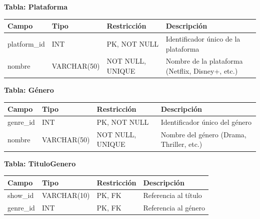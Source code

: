 \documentclass[12pt,a4paper]{article}
\begin{document}
\vspace{0.5cm}

\textbf{Tabla: Plataforma}

\vspace{0.2cm}
\begin{center}
\begin{tabular}{>{\ttfamily}p{3.8cm} p{2.8cm} p{2.5cm} p{5cm}}
\toprule
\normalfont Campo & Tipo & Restricci\'on & Descripci\'on \\
\midrule
platform\_id & INT          & PK, NOT NULL  & Identificador \'unico de la plataforma \\
nombre       & VARCHAR(50)  & NOT NULL, UNIQUE & Nombre de la plataforma (Netflix, Disney+, etc.) \\
\bottomrule
\end{tabular}
\end{center}

\vspace{0.5cm}

\textbf{Tabla: G\'enero}

\vspace{0.2cm}
\begin{center}
\begin{tabular}{>{\ttfamily}p{3.8cm} p{2.8cm} p{2.5cm} p{5cm}}
\toprule
\normalfont Campo & Tipo & Restricci\'on & Descripci\'on \\
\midrule
genre\_id & INT            & PK, NOT NULL  & Identificador \'unico del g\'enero \\
nombre    & VARCHAR(50)    & NOT NULL, UNIQUE & Nombre del g\'enero (Drama, Thriller, etc.) \\
\bottomrule
\end{tabular}
\end{center}

\vspace{0.5cm}

\textbf{Tabla: TituloGenero} 

\vspace{0.2cm}
\begin{center}
\begin{tabular}{>{\ttfamily}p{3.8cm} p{2.8cm} p{2.5cm} p{5cm}}
\toprule
\normalfont Campo & Tipo & Restricci\'on & Descripci\'on \\
\midrule
show\_id  & VARCHAR(10)    & PK, FK        & Referencia al t\'itulo \\
genre\_id & INT            & PK, FK        & Referencia al g\'enero \\
\bottomrule
\end{tabular}
\end{center}
\end{document}
